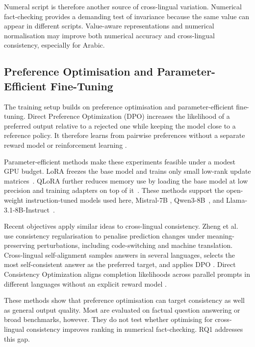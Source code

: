 Numeral script is therefore another source of cross-lingual variation. Numerical
fact-checking provides a demanding test of invariance because the same value can
appear in different scripts. Value-aware representations and numerical
normalisation may improve both numerical accuracy and cross-lingual consistency,
especially for Arabic.

\subsection{Preference Optimisation and Parameter-Efficient Fine-Tuning}
\label{subsec:peft}

The training setup builds on preference optimisation and parameter-efficient
fine-tuning. Direct Preference Optimization (DPO) increases the likelihood of a
preferred output relative to a rejected one while keeping the model close to a
reference policy. It therefore learns from pairwise preferences without a separate
reward model or reinforcement learning
\cite{rafailov2024directpreferenceoptimizationlanguage}.

Parameter-efficient methods make these experiments feasible under a modest GPU
budget. LoRA freezes the base model and trains only small low-rank update
matrices~\cite{hu2021loralowrankadaptationlarge}. QLoRA further reduces memory use
by loading the base model at low precision and training adapters on top of
it~\cite{dettmers2023qloraefficientfinetuningquantized}. These methods support the
open-weight instruction-tuned models used here, Mistral-7B
\cite{jiang2023mistral7b}, Qwen3-8B~\cite{qwen3technicalreport}, and
Llama-3.1-8B-Instruct~\cite{llama31instruct}.

Recent objectives apply similar ideas to cross-lingual consistency. Zheng et
al.~\cite{zheng2021consistencyregularizationcrosslingualfinetuning} use
consistency regularisation to penalise prediction changes under
meaning-preserving perturbations, including code-switching and machine translation.
Cross-lingual self-alignment samples answers in several languages, selects the most
self-consistent answer as the preferred target, and applies DPO
\cite{wang2025calmunleashingcrosslingualselfaligning}. Direct Consistency
Optimization aligns completion likelihoods across parallel prompts in different
languages without an explicit reward model
\cite{liu2026posttraininglanguagemodelscrosslingual}.

These methods show that preference optimisation can target consistency as well as
general output quality. Most are evaluated on factual question answering or broad
benchmarks, however. They do not test whether optimising for cross-lingual
consistency improves ranking in numerical fact-checking. RQ1 addresses this gap.

